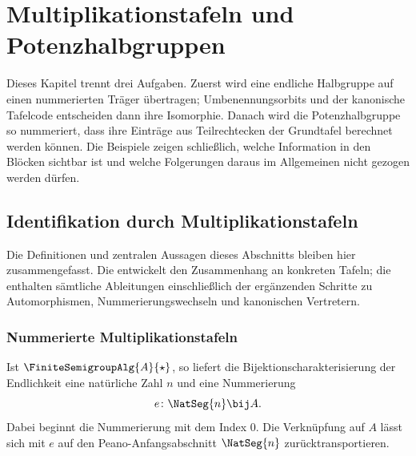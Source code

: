 \documentclass[main.tex]{subfiles}
\begin{document}


\ProofWideReasonsAtRight
\chapter{Multiplikationstafeln und Potenzhalbgruppen}

Dieses Kapitel trennt drei Aufgaben.  Zuerst wird eine endliche Halbgruppe
auf einen nummerierten Träger übertragen; Umbenennungsorbits und der
kanonische Tafelcode entscheiden dann ihre Isomorphie.  Danach wird die
Potenzhalbgruppe so nummeriert, dass ihre Einträge aus Teilrechtecken der
Grundtafel berechnet werden können.  Die Beispiele zeigen schließlich,
welche Information in den Blöcken sichtbar ist und welche Folgerungen
daraus im Allgemeinen nicht gezogen werden dürfen.

\section{Identifikation durch Multiplikationstafeln}
\hypertarget{table-isomorphisms.main}{}

Die Definitionen und zentralen Aussagen dieses Abschnitts bleiben hier
zusammengefasst. Die \TableIsomorphismsReadingLink{} entwickelt den
Zusammenhang an konkreten Tafeln; die \TableIsomorphismsProofsLink{}
enthalten sämtliche Ableitungen einschließlich der ergänzenden Schritte
zu Automorphismen, Nummerierungswechseln und kanonischen Vertretern.

\subsection{Nummerierte Multiplikationstafeln}

Ist \(\FiniteSemigroupAlg{A}{\star}\), so liefert die
Bijektionscharakterisierung der Endlichkeit eine natürliche Zahl \(n\) und
eine Nummerierung
\[
  e\colon\NatSeg{n}\bij A.
\]
Dabei beginnt die Nummerierung mit dem Index \(0\).  Die Verknüpfung auf
\(A\) lässt sich mit \(e\) auf den Peano-Anfangsabschnitt
\(\NatSeg{n}\) zurücktransportieren.
\end{document}
